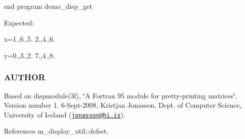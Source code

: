end program demo\+\_\+disp\+\_\+get

Expected\+:

x=1.,6.,5. 2.,4.,6.

y=0.,3.,2. 7.,4.,8.

\subsubsection*{A\+U\+T\+H\+OR}

Based on dispmodule(3f), \char`\"{}\+A Fortran 95 module for pretty-\/printing matrices\char`\"{}. Version number 1. 6-\/\+Sept-\/2008, Kristjan Jonasson, Dept. of Computer Science, University of Iceland (\href{mailto:jonasson@hi.is}{\tt jonasson@hi.\+is}). 

References m\+\_\+display\+\_\+util\+::defset.

\mbox{\label{namespacem__display_a0d50709ce2ad1894b93d80086584059a}} 
